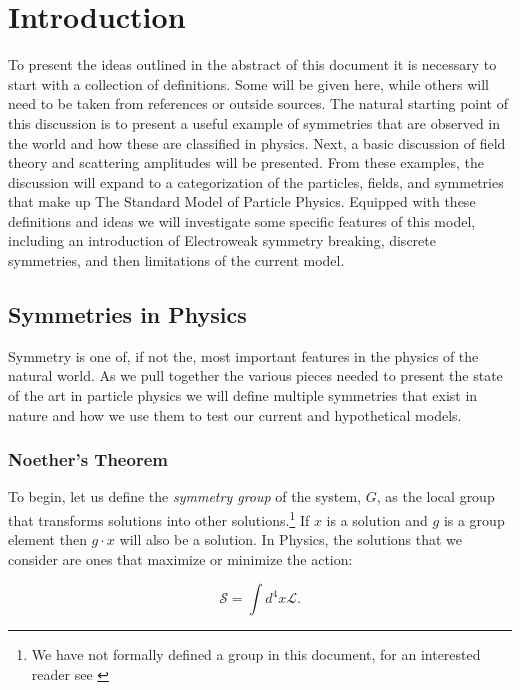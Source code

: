 \chapter{Introduction}
\label{sec:intro}

To present the ideas outlined in the abstract of this document it is necessary to start with a collection of definitions. Some will be given here, while others will need to be taken from references or outside sources. The natural starting point of this discussion is to present a useful example of symmetries that are observed in the world and how these are classified in physics. Next, a basic discussion of field theory and scattering amplitudes will be presented. From these examples, the discussion will expand to a categorization of the particles, fields, and symmetries that make up The Standard Model of Particle Physics. Equipped with these definitions and ideas we will investigate some specific features of this model, including an introduction of Electroweak symmetry breaking, discrete symmetries, and then limitations of the current model.

\section{Symmetries in Physics}
\label{sec:Symmetries}

Symmetry is one of, if not the, most important features in the physics of the natural world. As we pull together the various pieces needed to present the state of the art in particle physics we will define multiple symmetries that exist in nature and how we use them to test our current and hypothetical models.

\subsection{Noether's Theorem}
\label{sec:Noether}

To begin, let us define the \textit{symmetry group} of the system, $G$, as the local group that transforms solutions into other solutions.\footnote{We have not formally defined a group in this document, for an interested reader see \cite{Armstrong:1988,Miller:1972,Oliver:1993,Tung:1985}} If $x$ is a solution and $g$ is a group element then $ g \cdot x$ will also be a solution. In Physics, the solutions that we consider are ones that maximize or minimize the action:  

\begin{equation}
\label{eq:action}
\mathcal{S} = \int d^{4}x{\mathscr{L}}.
\end{equation}


